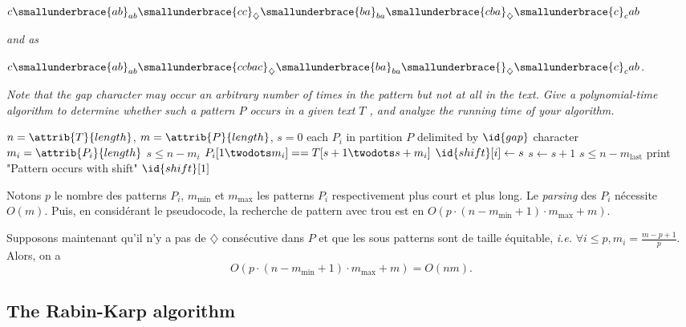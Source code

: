 \begin{description}
    $c\smallunderbrace{ab}_{ab}\smallunderbrace{cc}_{\diamondsuit}\smallunderbrace{ba}_{ba}\smallunderbrace{cba}_{\diamondsuit}\smallunderbrace{c}_{c}ab$

\textit{and as}

    $c\smallunderbrace{ab}_{ab}\smallunderbrace{ccbac}_{\diamondsuit}\smallunderbrace{ba}_{ba}\smallunderbrace{}_{\diamondsuit}\smallunderbrace{c}_{c}ab$.

\textit{Note that the gap character may occur an arbitrary number of times in the pattern
but not at all in the text. Give a polynomial-time algorithm to determine whether
such a pattern $P$ occurs in a given text $T$ , and analyze the running time of your
algorithm.}
\begin{ex}

\begin{codebox}
    \li $n = \attrib{T}{length}$,  $m = \attrib{P}{length}$, $s = 0$
    \li \For each $P_i$ in partition $P$ delimited by $\id{gap}$ character \Do
    \li $m_i = \attrib{P_i}{length}$
    \li \While $s \le n - m_i$ \Do
    \li \If $P_i[1\twodots m_i] == T[s + 1\twodots s + m_i]$ \Then
    \li $\id{shift}[i] \gets s$
    \li \Break \End
    \li $s \gets s + 1$ \End \End
    \li \If $s \le n-m_{\text{last}}$ \Then
    \li print "Pattern occurs with shift" $\id{shift}[1]$ \End
\end{codebox}

Notons $p$ le nombre des patterns $P_i$, $m_{\min}$ et $m_{\max}$ les patterns $P_i$ respectivement plus court et plus long. 
Le \textit{parsing} des $P_i$ nécessite $O(m)$. Puis, en considérant le pseudocode, la recherche de pattern avec trou est en $O(p \cdot (n - m_{\min} + 1) \cdot m_{\max} + m)$. 

Supposons maintenant qu'il n'y a pas de $\diamondsuit$ consécutive dans $P$ et que les sous patterns sont de taille équitable, \textit{i.e.} $\forall i \le p, m_i = \frac{m - p + 1}{p}$. Alors, on a
    \[O(p \cdot (n - m_{\min} + 1) \cdot m_{\max} + m) = O (nm).\]

\end{ex}

\end{description}

\subsection{The Rabin-Karp algorithm}

